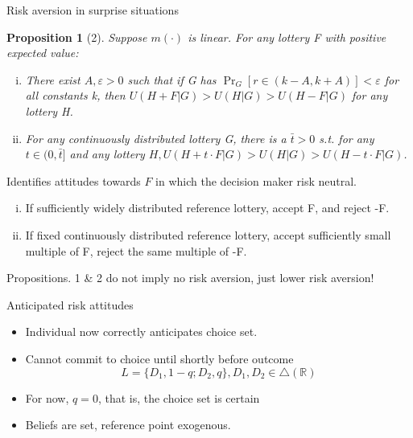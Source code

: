 \documentclass[11pt, aspectratio=169]{beamer}
\newtheorem{proposition}{Proposition}
\begin{document}
\begin{frame}{Risk aversion in surprise situations}
    \begin{proposition}[2]
        Suppose $m(\cdot)$ is linear. For any lottery F with positive expected value:
        \begin{enumerate}[(i)]
            \item There exist $A, \varepsilon >0 $ such that if G has $\Pr_G[r \in (k-A, k+A)]< \varepsilon $ for all constants k, then $U(H+F|G)> U(H|G)>U(H-F|G)$ for any lottery H.\medskip
            \item For any continuously distributed lottery G, there is a $\bar{t}>0 $ s.t. for any $t \in (0,\bar{t}]$ and any lottery $H, U(H+t\cdot F|G)> U(H|G)> U(H-t \cdot F|G)$.\medskip
        \end{enumerate}
    \end{proposition}
Identifies attitudes towards $F$ in which the decision maker risk neutral.\medskip
    \begin{enumerate}[(i)]
        \item If sufficiently widely distributed reference lottery, accept F, and reject -F.\medskip
        \item If fixed continuously distributed reference lottery, accept sufficiently small multiple of F, reject the same multiple of -F.\medskip
    \end{enumerate}
Propositions. 1 \& 2 do not imply no risk aversion, just lower risk aversion!
\end{frame}

\begin{frame}{Anticipated risk attitudes}
    \begin{itemize}
        \item Individual now correctly anticipates choice set. \medskip
        \item Cannot commit to choice until shortly before outcome
        \[L=\{D_1,1-q;D_2,q\}, D_1,D_2 \in \bigtriangleup (\mathbb{R})\]
        \item For now, $q=0$, that is, the choice set is certain\medskip
        \item Beliefs are set, reference point exogenous.\medskip
	\end{itemize}
   \end{frame}
\end{document}
